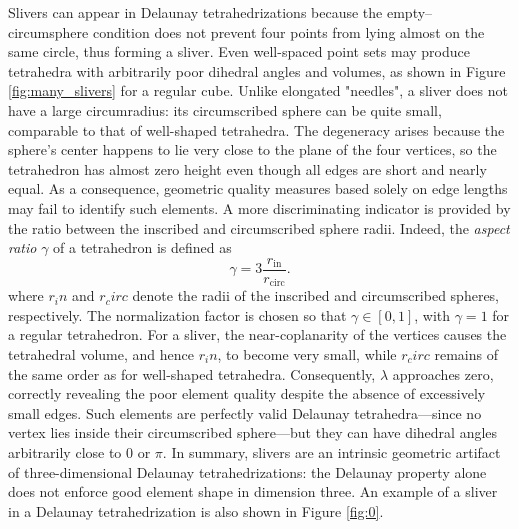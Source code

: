 \documentclass{article}
\begin{document}
Slivers can appear in Delaunay tetrahedrizations because the empty--circumsphere condition does not prevent four points from lying almost on the same circle, thus forming a sliver. Even well-spaced point sets may produce tetrahedra with arbitrarily poor dihedral angles and volumes, as shown in Figure \ref{fig:many_slivers} for a regular cube. Unlike elongated "needles", a sliver does not have a large circumradius: its circumscribed sphere can be quite small, comparable to that of well-shaped tetrahedra. The degeneracy arises because the sphere's center happens to lie very close to the plane of the four vertices, so the tetrahedron has almost zero height even though all edges are short and nearly equal. As a consequence, geometric quality measures based solely on edge lengths may fail to identify such elements. A more discriminating indicator is provided by the ratio between the inscribed and circumscribed sphere radii. Indeed, the \emph{aspect ratio} $\gamma$ of a tetrahedron is defined as
\[
\gamma = {3} \frac{r_{\mathrm{in}}}{r_{\mathrm{circ}}}.
\]
where $r_in$ and $r_circ$ denote the radii of the inscribed and circumscribed spheres, respectively. The normalization factor is chosen so that $\gamma \in [0,1]$, with $\gamma=1$ for a regular tetrahedron. For a sliver, the near-coplanarity of the vertices causes the tetrahedral volume, and hence $r_in$, to become very small, while $r_circ$ remains of the same order as for well-shaped tetrahedra. Consequently, $\lambda$ approaches zero, correctly revealing the poor element quality despite the absence of excessively small edges.
Such elements are perfectly valid Delaunay tetrahedra—since no vertex lies inside their circumscribed sphere—but they can have dihedral angles arbitrarily close to $0$ or $\pi$.  
In summary, slivers are an intrinsic geometric artifact of three-dimensional Delaunay tetrahedrizations: the Delaunay property alone does not enforce good element shape in dimension three. An example of a sliver in a Delaunay tetrahedrization is also shown in Figure \ref{fig:0}.
\end{document}
